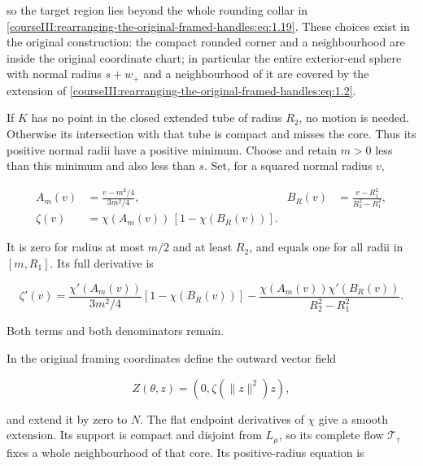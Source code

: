 so the target region lies beyond the whole rounding collar in \eqref{courseIII:rearranging-the-original-framed-handles:eq:1.19}. These choices exist in the original construction: the compact rounded corner and a neighbourhood are inside the original coordinate chart; in particular the entire exterior-end sphere with normal radius \(s+w_+\) and a neighbourhood of it are covered by the extension of \eqref{courseIII:rearranging-the-original-framed-handles:eq:1.2}.

If \(K\) has no point in the closed extended tube of radius \(R_2\), no motion is needed. Otherwise its intersection with that tube is compact and misses the core. Thus its positive normal radii have a positive minimum. Choose and retain \(m>0\) less than this minimum and also less than \(s\). Set, for a squared normal radius \(v\),

\begin{equation}
\begin{aligned}
A_m(v)&=\frac{v-m^2/4}{3m^2/4},&
B_R(v)&=\frac{v-R_1^2}{R_2^2-R_1^2},\\
\zeta(v)&=\chi(A_m(v))\,[1-\chi(B_R(v))].
\end{aligned}
\label{courseIII:rearranging-the-original-framed-handles:eq:3.2}
\end{equation}

It is zero for radius at most \(m/2\) and at least \(R_2\), and equals one for all radii in \([m,R_1]\). Its full derivative is

\begin{equation}
\zeta'(v)=
\frac{\chi'(A_m(v))}{3m^2/4}[1-\chi(B_R(v))]
-\frac{\chi(A_m(v))\chi'(B_R(v))}{R_2^2-R_1^2}.
\label{courseIII:rearranging-the-original-framed-handles:eq:3.3}
\end{equation}

Both terms and both denominators remain.

In the original framing coordinates define the outward vector field

\begin{equation}
Z(\theta,z)=(0,\zeta(\|z\|^2)z),
\label{courseIII:rearranging-the-original-framed-handles:eq:3.4}
\end{equation}

and extend it by zero to \(N\). The flat endpoint derivatives of \(\chi\) give a smooth extension. Its support is compact and disjoint from \(L_\mu\), so its complete flow \(\mathcal T_\tau\) fixes a whole neighbourhood of that core. Its positive-radius equation is

